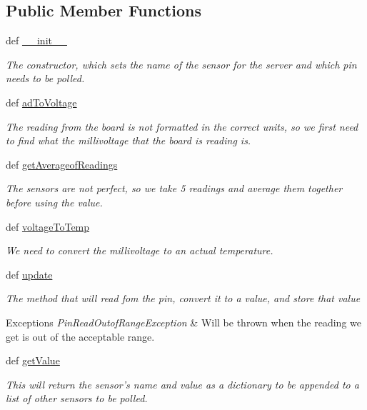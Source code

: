 \subsection*{Public Member Functions}
\begin{DoxyCompactItemize}
\item 
def \hyperlink{classsensing_1_1_temperature_sensor_a35bf393ac9f3fadc1bcec9e32eb9a7d6}{\-\_\-\-\_\-init\-\_\-\-\_\-}
\begin{DoxyCompactList}\small\item\em The constructor, which sets the name of the sensor for the server and which pin needs to be polled. \end{DoxyCompactList}\item 
def \hyperlink{classsensing_1_1_temperature_sensor_aaeb85a07038568c56f0e3543815068d7}{ad\-To\-Voltage}
\begin{DoxyCompactList}\small\item\em The reading from the board is not formatted in the correct units, so we first need to find what the millivoltage that the board is reading is. \end{DoxyCompactList}\item 
def \hyperlink{classsensing_1_1_temperature_sensor_a5129c7aa8fabc66c80b645186518ecac}{get\-Averageof\-Readings}
\begin{DoxyCompactList}\small\item\em The sensors are not perfect, so we take 5 readings and average them together before using the value. \end{DoxyCompactList}\item 
def \hyperlink{classsensing_1_1_temperature_sensor_aaf6d138cf7d3155597a11b359fa9afe7}{voltage\-To\-Temp}
\begin{DoxyCompactList}\small\item\em We need to convert the millivoltage to an actual temperature. \end{DoxyCompactList}\item 
def \hyperlink{classsensing_1_1_temperature_sensor_adce48cedf1d9fdd706c374ec1217bd94}{update}
\begin{DoxyCompactList}\small\item\em The method that will read fom the pin, convert it to a value, and store that value 
\begin{DoxyExceptions}{Exceptions}
{\em Pin\-Read\-Outof\-Range\-Exception} & Will be thrown when the reading we get is out of the acceptable range. \\
\hline
\end{DoxyExceptions}
\end{DoxyCompactList}\item 
def \hyperlink{classsensing_1_1_temperature_sensor_a556e30e17858efbb95521dfafe6ee0cc}{get\-Value}
\begin{DoxyCompactList}\small\item\em This will return the sensor's name and value as a dictionary to be appended to a list of other sensors to be polled. \end{DoxyCompactList}\end{DoxyCompactItemize}


